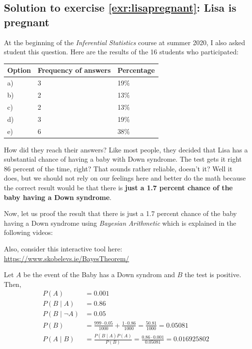 \documentclass[
  12pt,
  oneside]{book}
\theoremstyle{definition}
\theoremstyle{definition}
\theoremstyle{definition}
\theoremstyle{definition}
\theoremstyle{remark}
\begin{document}
\hypertarget{sol:lisapregnant}{%
\subsection*{Solution to exercise \ref{exr:lisapregnant}: Lisa is pregnant}\label{sol:lisapregnant}}

At the beginning of the \emph{Inferential Statistics} course at summer 2020, I also asked student this question. Here are the results of the 16 students who participated:

\begin{longtable}[]{@{}lll@{}}
\toprule()
Option & Frequency of answers & Percentage \\
\midrule()
\endhead
a) & 3 & 19\% \\
b) & 2 & 13\% \\
c) & 2 & 13\% \\
d) & 3 & 19\% \\
e) & 6 & 38\% \\
\bottomrule()
\end{longtable}

How did they reach their answers? Like most people, they decided that Lisa has a substantial chance of having a baby with Down syndrome. The test gets it right 86 percent of the time, right? That sounds rather reliable, doesn't it? Well it does, but we should not rely on our feelings here and better do the math because the correct result would be that there is \textbf{just a 1.7 percent chance of the baby having a Down syndrome}.

Now, let us proof the result that there is just a 1.7 percent chance of the baby having a Down syndrome using \emph{Bayesian Arithmetic} which is explained in the following videos:

Also, consider this interactive tool here: \url{https://www.skobelevs.ie/BayesTheorem/}

Let \(A\) be the event of the Baby has a Down syndrom and \(B\) the test is positive. Then,
\begin{align*}
    P(A)&=0.001\\
    P(B\mid A)&=0.86\\
    P(B\mid \neg A)&=0.05\\
    P(B)&=\frac{999\cdot 0.05}{1000}+\frac{1\cdot 0.86}{1000}=\frac{50.81}{1000}=0.05081\\
    P(A\mid B)&={\frac {P(B\mid A)P(A)}{P(B)}}=\frac{0.86 \cdot 0.001}{0.05081}=0.016925802
\end{align*}
\end{document}
